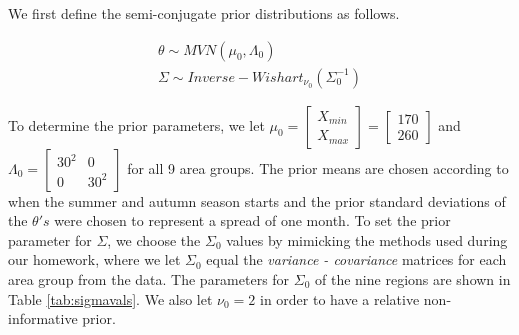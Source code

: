 \documentclass{article}
\begin{document}
We first define the semi-conjugate prior distributions as follows. 

\begin{align*}
\theta \sim MVN(\mu_0, \Lambda_0) \\
\Sigma \sim Inverse-Wishart_{\nu_0}(\Sigma_0^{-1})
\end{align*}

To determine the prior parameters, we let $\mu_0 = \begin{bmatrix} X_{min} \\ X_{max} \end{bmatrix} = \begin{bmatrix} 170 \\ 260 \end{bmatrix}$ and $\Lambda_0 = \begin{bmatrix} 30^2 & 0 \\ 0 & 30^2 \end{bmatrix}$ for all 9 area groups. The prior means are chosen according to when the summer and autumn season starts and the prior standard deviations of the $\theta 's$ were chosen to represent a spread of one month. To set the prior parameter for $\Sigma$, we choose the $\Sigma_0$ values by mimicking the methods used during our homework, where we let $\Sigma_0$ equal the \textit{variance - covariance} matrices for each area group from the data. The parameters for $\Sigma_0$ of the nine regions are shown in Table \ref{tab:sigmavals}. We also let $\nu_0 = 2$ in order to have a relative non-informative prior.
\end{document}
